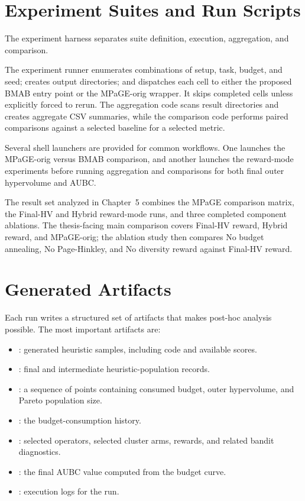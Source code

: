 \documentclass[../main.tex]{subfiles}
\begin{document}
\section{Experiment Suites and Run Scripts}

The experiment harness separates suite definition, execution, aggregation, and comparison.

The experiment runner enumerates combinations of setup, task, budget, and seed; creates output directories; and dispatches each cell to either the proposed BMAB entry point or the MPaGE-orig wrapper. It skips completed cells unless explicitly forced to rerun. The aggregation code scans result directories and creates aggregate CSV summaries, while the comparison code performs paired comparisons against a selected baseline for a selected metric.

Several shell launchers are provided for common workflows. One launches the MPaGE-orig versus BMAB comparison, and another launches the reward-mode experiments before running aggregation and comparisons for both final outer hypervolume and AUBC.

The result set analyzed in Chapter~5 combines the MPaGE comparison matrix, the Final-HV and Hybrid reward-mode runs, and three completed component ablations. The thesis-facing main comparison covers Final-HV reward, Hybrid reward, and MPaGE-orig; the ablation study then compares No budget annealing, No Page-Hinkley, and No diversity reward against Final-HV reward.

\section{Generated Artifacts}

Each run writes a structured set of artifacts that makes post-hoc analysis possible. The most important artifacts are:

\begin{itemize}
  \item {}: generated heuristic samples, including code and available scores.
  \item {}: final and intermediate heuristic-population records.
  \item {}: a sequence of points containing consumed budget, outer hypervolume, and Pareto population size.
  \item {}: the budget-consumption history.
  \item {}: selected operators, selected cluster arms, rewards, and related bandit diagnostics.
  \item {}: the final AUBC value computed from the budget curve.
  \item {}: execution logs for the run.
\end{itemize}
\end{document}
